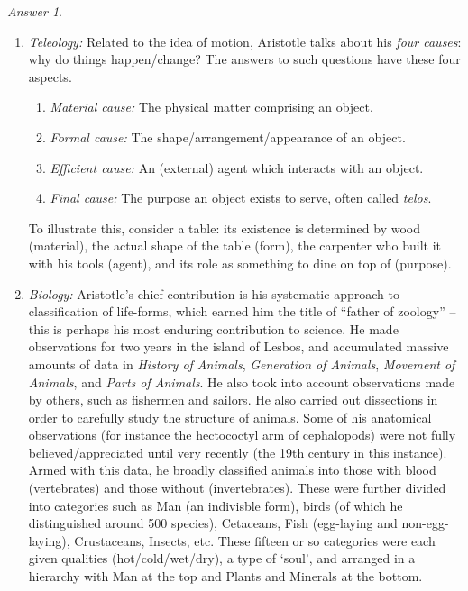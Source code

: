 \documentclass[11pt]{article}
\theoremstyle{remark}
\newtheorem*{answer}{Answer}
\begin{document}
\begin{answer}
\begin{enumerate}
            \item \textit{Teleology:} Related to the idea of motion, Aristotle talks
            about his \textit{four causes}: why do things happen/change? The answers
            to such questions have these four aspects.
            \begin{enumerate}
                \item \textit{Material cause:} The physical matter comprising an
                object.
                \item \textit{Formal cause:} The shape/arrangement/appearance of an
                object.
                \item \textit{Efficient cause:} An (external) agent which interacts
                with an object.
                \item \textit{Final cause:} The purpose an object exists to serve,
                often called \textit{telos}.
            \end{enumerate}
            To illustrate this, consider a table: its existence is determined by wood
            (material), the actual shape of the table (form), the carpenter who built
            it with his tools (agent), and its role as something to dine on top of
            (purpose).

            \item \textit{Biology:} Aristotle's chief contribution is his systematic
            approach to classification of life-forms, which earned him the title of
            ``father of zoology'' -- this is perhaps his most enduring contribution
            to science. He made observations for two years in the island of Lesbos,
            and accumulated massive amounts of data in \textit{History of Animals},
            \textit{Generation of Animals}, \textit{Movement of Animals}, and
            \textit{Parts of Animals}. He also took into account observations made by
            others, such as fishermen and sailors. He also carried out dissections in
            order to carefully study the structure of animals. Some of his anatomical
            observations (for instance the hectococtyl arm of cephalopods) were not
            fully believed/appreciated until very recently (the 19th century in this
            instance). Armed with this data, he broadly classified animals into those
            with blood (vertebrates) and those without (invertebrates). These were
            further divided into categories such as Man (an indivisble form), birds
            (of which he distinguished around 500 species), Cetaceans, Fish
            (egg-laying and non-egg-laying), Crustaceans, Insects, etc. These fifteen
            or so categories were each given qualities (hot/cold/wet/dry), a type of
            `soul', and arranged in a hierarchy with Man at the top and Plants and
            Minerals at the bottom.


\end{enumerate}
\end{answer}
\end{document}
